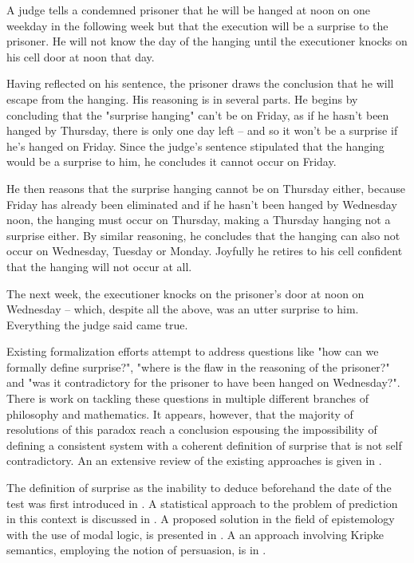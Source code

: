 \documentclass[journal]{journal}
\newenvironment{myindent}{\begin{adjustwidth}{1cm}{}}{\end{adjustwidth}}
\begin{document}
\begin{myindent}
  A judge tells a condemned prisoner that he will be hanged at noon on one weekday
  in the following week but that the execution will be a surprise to the prisoner.
  He will not know the day of the hanging until the executioner knocks on his cell door at noon that day.

  Having reflected on his sentence, the prisoner draws the conclusion that he will
  escape from the hanging. His reasoning is in several parts. He begins by concluding
  that the "surprise hanging" can't be on Friday, as if he hasn't been hanged by
  Thursday, there is only one day left – and so it won't be a surprise if he's hanged on
  Friday. Since the judge's sentence stipulated that the hanging would be a surprise
  to him, he concludes it cannot occur on Friday.

  He then reasons that the surprise hanging cannot be on Thursday either, because
  Friday has already been eliminated and if he hasn't been hanged by Wednesday noon,
  the hanging must occur on Thursday, making a Thursday hanging not a surprise either.
  By similar reasoning, he concludes that the hanging can also not occur on Wednesday,
  Tuesday or Monday. Joyfully he retires to his cell confident that the hanging will
  not occur at all.

  The next week, the executioner knocks on the prisoner's door at noon on Wednesday –
  which, despite all the above, was an utter surprise to him. Everything the judge said came true.
\end{myindent}

Existing formalization efforts attempt to address questions like "how can we formally
define surprise?", "where is the flaw in the
reasoning of the prisoner?" and "was it contradictory for the prisoner to have been
hanged on Wednesday?". There is work on tackling these questions in multiple
different branches of philosophy and mathematics.
It appears, however, that the majority of resolutions
of this paradox reach a conclusion espousing the impossibility of
defining a consistent system with a coherent definition of surprise that is not
self contradictory.
An an extensive review of the existing approaches is given in \cite{extensivereview}.

The definition of surprise as the inability to deduce beforehand the date of the test
was first introduced in \cite{prediction}. A statistical approach to the problem
of prediction in this context is discussed in \cite{statistical}.
A proposed solution in the field of epistemology with the use of modal
logic, is presented in \cite{modalepistemic}. A an approach involving
Kripke semantics, employing the notion of persuasion, is in \cite{kripkemodal}.
\end{document}
